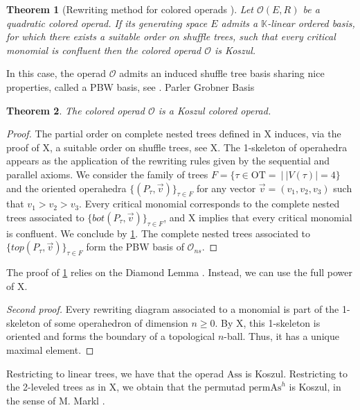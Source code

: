 \documentclass[10pt]{amsart}
\newtheorem{thm}{Theorem}[section]
\theoremstyle{definition}
\theoremstyle{remark}
\numberwithin{equation}{section}
\newcommand{\0}{\color{blue}{\mathsf{0}}}
\begin{document}
\begin{thm}[Rewriting method for colored operads {\cite[Theorem 8.3.1]{LodayVallette12}}] \label{thm:rewriting} Let $\mathcal{O}(E,R)$ be a quadratic colored operad. If its generating space $E$ admits a $\mathbb{K}$-linear ordered basis, for which there exists a suitable order on shuffle trees, such that every critical monomial is confluent then the colored operad $\mathcal{O}$ is Koszul. 
\end{thm}

In this case, the operad $\mathcal{O}$ admits an induced shuffle tree basis sharing nice properties, called a PBW basis, see \cite[Section 8.5.3]{LodayVallette12}. Parler Grobner Basis

\begin{thm} \label{thm:Koszulrewriting} The colored operad $\mathcal{O}$ is a Koszul colored operad. 
\end{thm}
\begin{proof} The partial order on complete nested trees defined in X induces, via the proof of X, a suitable order on shuffle trees, see X. The 1-skeleton of operahedra appears as the application of the rewriting rules given by the sequential and parallel axioms. We consider the family of trees $F=\{\tau \in \mathrm{OT}=\ | \ |V(\tau)|=4\}$ and the oriented operahedra $\{(P_\tau,\vec v)\}_{\tau \in F}$ for any vector $\vec v=(v_1,v_2,v_3)$ such that $v_1>v_2>v_3$. Every critical monomial corresponds to the complete nested trees associated to $\{bot(P_\tau,\vec v)\}_{\tau \in F}$, and X implies that every critical monomial is confluent. We conclude by \cref{thm:rewriting}. 
The complete nested trees associated to $\{top(P_\tau, \vec v)\}_{\tau \in F}$ form the PBW basis of $\mathcal{O}_{ns}$.
\end{proof}

The proof of \cref{thm:rewriting} relies on the Diamond Lemma \cite[Theorem 8.5.5]{LodayVallette12}. Instead, we can use the full power of X.

\begin{proof}[Second proof] Every rewriting diagram associated to a monomial is part of the 1-skeleton of some operahedron of dimension $n\geq 0$. By X, this 1-skeleton is oriented and forms the boundary of a topological $n$-ball. Thus, it has a unique maximal element. 
\end{proof}

Restricting to linear trees, we have that the operad $\mathrm{Ass}$ is Koszul. Restricting to the 2-leveled trees as in X, we obtain that the permutad $\mathrm{permAs}^h$ is Koszul, in the sense of M. Markl \cite[Definition 21]{Markl19}.
\end{document}
